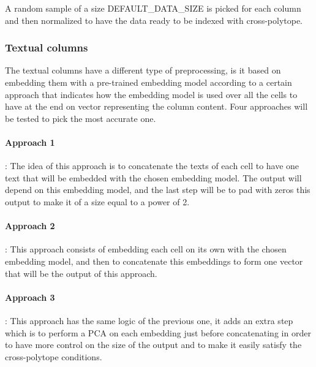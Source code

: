 A random sample of a size \mbox{DEFAULT\_DATA\_SIZE} is picked for each column
and then normalized to have the data ready to be indexed with cross-polytope.

\subsubsection{Textual columns}
The textual columns have a different type of preprocessing, is it based on
embedding them with a pre-trained embedding model according to a certain
approach that indicates how the embedding model is used over all the cells to
have at the end on vector representing the column content. Four approaches will
be tested to pick the most accurate one.

\paragraph{Approach 1}: The idea of this approach is to concatenate the texts of
each cell to have one text that will be embedded with the chosen embedding
model. The output will depend on this embedding model, and the last step will be
to pad with zeros this output to make it of a size equal to a power of 2.

\paragraph{Approach 2}: This approach consists of embedding each cell on its own
with the chosen embedding model, and then to concatenate this embeddings to form
one vector that will be the output of this approach.

\paragraph{Approach 3}: This approach has the same logic of the previous one, it
adds an extra step which is to perform a PCA on each embedding just before
concatenating in order to have more control on the size of the output and to
make it easily satisfy the cross-polytope conditions.

